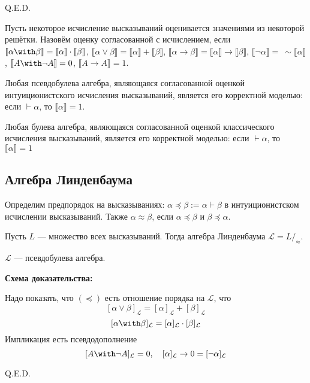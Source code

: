 \hfill Q.E.D.

 Пусть некоторое исчисление высказываний оценивается значениями из некоторой решётки.
Назовём оценку согласованной с исчислением, если 
$\llbracket\alpha\with\beta\rrbracket = \llbracket\alpha\rrbracket\cdot\llbracket\beta\rrbracket$,
$\llbracket\alpha\vee\beta\rrbracket = \llbracket\alpha\rrbracket+\llbracket\beta\rrbracket$,
$\llbracket\alpha\rightarrow\beta\rrbracket = \llbracket\alpha\rrbracket\rightarrow\llbracket\beta\rrbracket$,
$\llbracket\neg\alpha\rrbracket =\ \sim\llbracket\alpha\rrbracket$,
$\llbracket A \with\neg A\rrbracket = 0$, $\llbracket A\rightarrow A \rrbracket = 1$.


Любая псевдобулева алгебра, являющаяся согласованной оценкой интуиционистского исчисления высказываний,
является его корректной моделью: если $\vdash\alpha$, то $\llbracket\alpha\rrbracket = 1$.



Любая булева алгебра, являющаяся согласованной оценкой классического исчисления высказываний, 
является его корректной моделью: если $\vdash\alpha$, то $\llbracket\alpha\rrbracket = 1$


\subsection{Алгебра Линденбаума}

 Определим предпорядок на высказываниях: $\alpha \preceq \beta := \alpha \vdash \beta$ в интуиционистском исчислении высказываний.
Также $\alpha\approx\beta$, если $\alpha\preceq\beta$ и $\beta\preceq\alpha$.

 Пусть $L$ --- множество всех высказываний. Тогда алгебра Линденбаума $\mathcal{L} = L/_\approx$.



$\mathcal{L}$ --- псевдобулева алгебра.

\textbf{Схема доказательства:}

 Надо показать, что $(\preceq)$ есть отношение порядка на $\mathcal{L}$, что
$$[\alpha\vee\beta]_\mathcal{L} = [\alpha]_\mathcal{L}+[\beta]_\mathcal{L}$$
$$[\alpha\with\beta]_\mathcal{L} = [\alpha]_\mathcal{L}\cdot[\beta]_\mathcal{L}$$ Импликация есть псевдодополнение
$$[A\with\neg A]_\mathcal{L} = 0, \quad [\alpha]_\mathcal{L}\rightarrow 0 = [\neg\alpha]_\mathcal{L}$$

\hfill Q.E.D.


